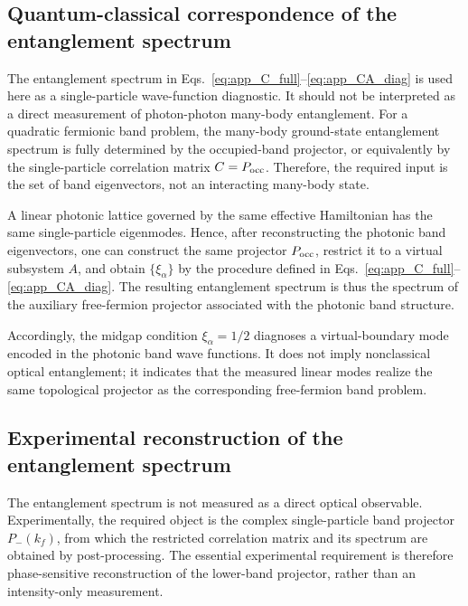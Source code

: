 \documentclass[aps,prl,twocolumn,preprintnumbers,amsmath,amssymb,superscriptaddress,10pt]{revtex4-2}
\begin{document}

\subsection{Quantum-classical correspondence of the entanglement spectrum}
\label{app:ES_photonic_interpretation}

The entanglement spectrum in Eqs.~\eqref{eq:app_C_full}--\eqref{eq:app_CA_diag}
is used here as a single-particle wave-function diagnostic. It should not be interpreted as a direct measurement of photon-photon many-body entanglement. For a quadratic fermionic band problem, the many-body ground-state entanglement spectrum is fully determined by the occupied-band projector, or equivalently by the single-particle correlation matrix $C=P_{\rm occ}$. Therefore, the required input is the set of band eigenvectors, not an interacting many-body state.

A linear photonic lattice governed by the same effective Hamiltonian has
the same single-particle eigenmodes. Hence, after reconstructing the
photonic band eigenvectors, one can construct the same projector
$P_{\rm occ}$, restrict it to a virtual subsystem $A$, and obtain
$\{\xi_\alpha\}$ by the procedure defined in
Eqs.~\eqref{eq:app_C_full}--\eqref{eq:app_CA_diag}. The resulting
entanglement spectrum is thus the spectrum of the auxiliary free-fermion
projector associated with the photonic band structure.

Accordingly, the midgap condition $\xi_\alpha=1/2$ diagnoses a
virtual-boundary mode encoded in the photonic band wave functions. It
does not imply nonclassical optical entanglement; it indicates that the
measured linear modes realize the same topological projector as the
corresponding free-fermion band problem.


  
\subsection{Experimental reconstruction of the entanglement spectrum}
\label{app:ES_experimental_protocol}

The entanglement spectrum is not measured as a direct optical observable.
Experimentally, the required object is the complex single-particle band
projector $P_-(k_f)$, from which the restricted correlation matrix and
its spectrum are obtained by post-processing. The essential experimental
requirement is therefore phase-sensitive reconstruction of the lower-band
projector, rather than an intensity-only measurement.
\end{document}
